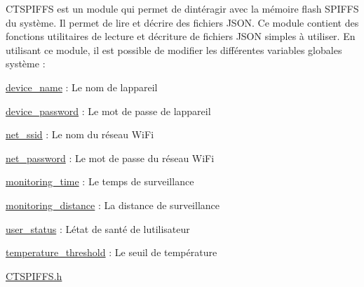 CTSPIFFS est un module qui permet de d\textquotesingle{}intéragir avec la mémoire flash SPIFFS du système. Il permet de lire et d\textquotesingle{}écrire des fichiers JSON. Ce module contient des fonctions utilitaires de lecture et d\textquotesingle{}écriture de fichiers JSON simples à utiliser. En utilisant ce module, il est possible de modifier les différentes variables globales système \+:


\begin{DoxyItemize}
\item \mbox{\hyperlink{_c_t_s_p_i_f_f_s_8h_a8dfd96f6f709ce443636ca56e0cfadcf}{device\+\_\+name}} \+: Le nom de l\textquotesingle{}appareil
\item \mbox{\hyperlink{_c_t_s_p_i_f_f_s_8h_ad8b7cc350ecbeeb4996d0e2151d9ecd7}{device\+\_\+password}} \+: Le mot de passe de l\textquotesingle{}appareil
\item \mbox{\hyperlink{_c_t_s_p_i_f_f_s_8h_ad26538ba868015b0ad8e7063d725ac10}{net\+\_\+ssid}} \+: Le nom du réseau Wi\+Fi
\item \mbox{\hyperlink{_c_t_s_p_i_f_f_s_8h_af6ef0046248df12325414b15f6563307}{net\+\_\+password}} \+: Le mot de passe du réseau Wi\+Fi
\item \mbox{\hyperlink{_c_t_s_p_i_f_f_s_8h_a2e5f1885229558ed3301244352309fb7}{monitoring\+\_\+time}} \+: Le temps de surveillance
\item \mbox{\hyperlink{_c_t_s_p_i_f_f_s_8h_ac7331f24861797ee5765f93fc9fa0a5b}{monitoring\+\_\+distance}} \+: La distance de surveillance
\item \mbox{\hyperlink{_c_t_s_p_i_f_f_s_8h_af62606a4cab2472ff56d785a56edbac6}{user\+\_\+status}} \+: L\textquotesingle{}état de santé de l\textquotesingle{}utilisateur
\item \mbox{\hyperlink{_c_t_s_p_i_f_f_s_8h_a0037b5d48f54912d2dbe7da71d80e7c6}{temperature\+\_\+threshold}} \+: Le seuil de température
\end{DoxyItemize}

\mbox{\hyperlink{_c_t_s_p_i_f_f_s_8h}{CTSPIFFS.\+h}} 